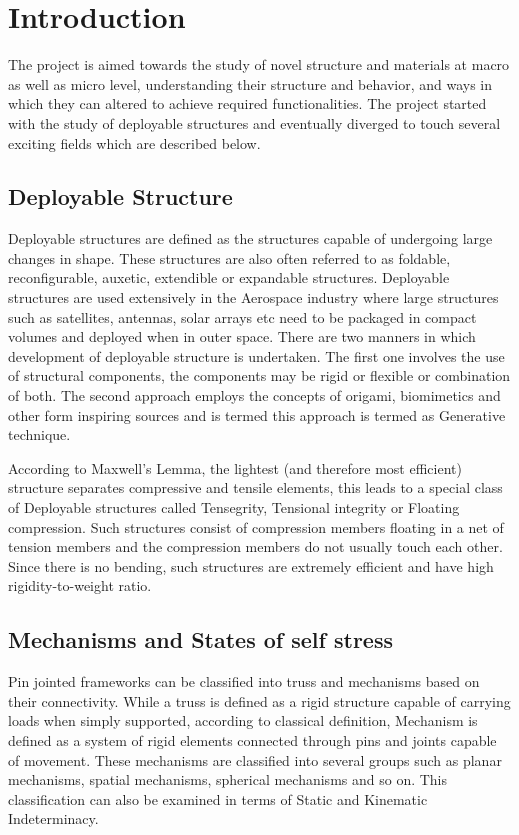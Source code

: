 \chapter{Introduction}
The project is aimed towards the study of novel structure and materials at macro as well as micro level, understanding their structure and behavior, and ways in which they can altered to achieve required functionalities. The project started with the study of deployable structures and eventually diverged to touch several exciting fields which are described below.

\section{Deployable Structure}
Deployable structures are defined as the structures capable of undergoing large changes in shape. These structures are also often referred to as foldable, reconfigurable, auxetic, extendible or expandable structures. Deployable structures are used extensively in the Aerospace industry where large structures such as satellites, antennas, solar arrays etc need to be packaged in compact volumes and deployed when in outer space. There are two manners in which development of deployable structure is undertaken. The first one involves the use of structural components, the components may be rigid or flexible or combination of both. The second approach employs the concepts of origami, biomimetics and other form inspiring sources and is termed this approach is termed as Generative technique.\cite{rivas2015deployable}


According to Maxwell's Lemma, the lightest (and therefore most efficient) structure separates compressive and tensile elements, this leads to a special class of Deployable structures called Tensegrity, Tensional integrity or Floating compression. Such structures consist of compression members floating in a net of tension members and the compression members do not usually touch each other. Since there is no bending, such structures are extremely efficient and have high rigidity-to-weight ratio. \cite{pellegr}

\section{Mechanisms and States of self stress}
Pin jointed frameworks can be classified into truss and mechanisms based on their connectivity. While a truss is defined as a rigid structure capable of carrying loads when simply supported, according to classical definition, Mechanism is defined as a system of rigid elements connected through pins and joints capable of movement. These mechanisms are classified into several groups such as planar mechanisms, spatial mechanisms, spherical mechanisms and so on. This classification can also be examined in terms of Static and Kinematic Indeterminacy.\cite{Pelle}


